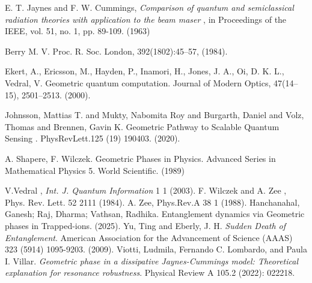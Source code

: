 \label{ch:referencias}
\renewcommand\bibname{Referencias}

\begin{thebibliography}{9}
E. T. Jaynes and F. W. Cummings, 
\textit{Comparison of quantum and semiclassical radiation theories with application to the beam maser}
, in Proceedings of the IEEE, vol. 51, no. 1, pp. 89-109. (1963) 

Berry M. V. Proc. R. Soc. London, 392(1802):45–57, (1984).

Ekert, A., Ericsson, M., Hayden, P., Inamori, H., Jones, J. A., Oi, D. K. L., Vedral, V.  Geometric quantum computation. Journal of Modern Optics, 47(14–15), 2501–2513. (2000).

Johnsson, Mattias T. and Mukty, Nabomita Roy and Burgarth, Daniel and Volz, Thomas and Brennen, Gavin K. Geometric Pathway to Scalable Quantum Sensing . PhysRevLett.125 (19) 190403. (2020).

A. Shapere, F. Wilczek. Geometric Phases in Physics. Advanced Series in Mathematical Physics 5. World Scientific. (1989) 

V.Vedral , \textit{Int. J. Quantum Information} 1 1 (2003).
F. Wilczek and A. Zee , Phys. Rev. Lett. 52 2111 (1984).
A. Zee, Phys.Rev.A 38 1 (1988). 
Hanchanahal, Ganesh; Raj, Dharma; Vathsan, Radhika. Entanglement dynamics via Geometric phases in Trapped-ions. (2025).
Yu, Ting and Eberly, J. H.
\textit{Sudden Death of Entanglement}. American Association for the Advancement of Science (AAAS) 323 (5914) 1095-9203. (2009). 
Viotti, Ludmila, Fernando C. Lombardo, and Paula I. Villar. \textit{Geometric phase in a dissipative Jaynes-Cummings model: Theoretical explanation for resonance robustness}. Physical Review A 105.2 (2022): 022218.


\end{thebibliography}
